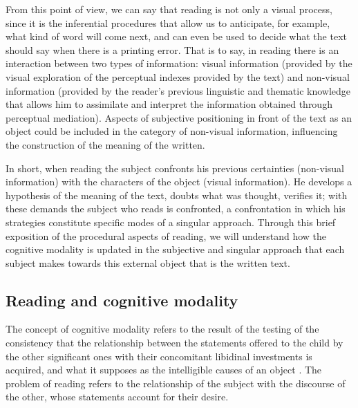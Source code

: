 \documentclass[english]{textolivre}
\begin{document}
From this point of view, we can say that reading is not only a visual process, since it is the inferential procedures that allow us to anticipate, for example, what kind of word will come next, and can even be used to decide what the text should say when there is a printing error. That is to say, in reading there is an interaction between two types of information: visual information (provided by the visual exploration of the perceptual indexes provided by the text) and non-visual information (provided by the reader's previous linguistic and thematic knowledge that allows him to assimilate and interpret the information obtained through perceptual mediation). Aspects of subjective positioning in front of the text as an object could be included in the category of non-visual information, influencing the construction of the meaning of the written.

In short, when reading the subject confronts his previous certainties (non-visual information) with the characters of the object (visual information). He develops a hypothesis of the meaning of the text,  doubts what was thought, verifies it; with these demands the subject who reads is confronted, a confrontation in which his strategies constitute specific modes of a singular approach. Through this brief exposition of the procedural aspects of reading, we will understand how the cognitive modality is updated in the subjective and singular approach that each subject makes towards this external object that is the written text.

\subsection{Reading and cognitive modality}\label{sec-normas}
The concept of cognitive modality refers to the result of the testing of the consistency that the relationship between the statements offered to the child by the other significant ones with their concomitant libidinal investments is acquired, and what it supposes as the intelligible causes of an object \cite{wettengel_produccion_1995}. The problem of reading refers to the relationship of the subject with the discourse of the other, whose statements account for their desire.
\end{document}
